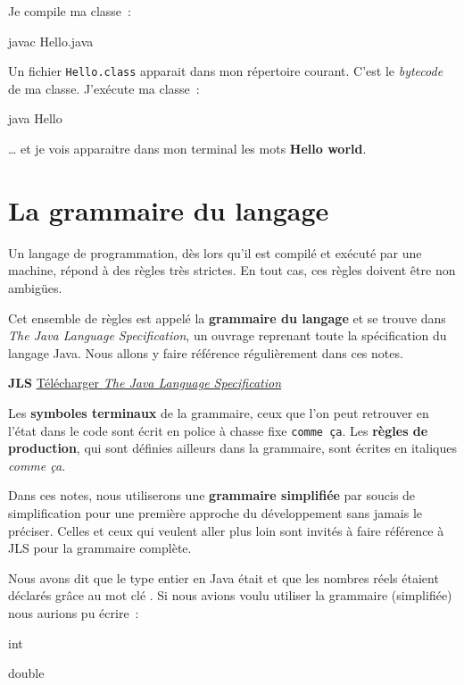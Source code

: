 Je compile ma classe~:

\begin{term}
	javac Hello.java
\end{term}

Un fichier \texttt{Hello.class} apparait dans mon répertoire courant. C'est le 
\textit{bytecode} de ma classe. J'exécute ma classe~:

\begin{term}
	java Hello
\end{term}

… et je vois apparaitre dans mon terminal les mots \textbf{Hello world}. 





\section{La grammaire du langage}

Un langage de programmation, dès lors qu'il est compilé et exécuté par une
machine, répond à des règles très strictes. En tout cas, ces règles doivent être
non ambigües. 

Cet ensemble de règles est appelé la \textbf{grammaire du
langage} et se trouve dans \textit{The Java Language
Specification}, un ouvrage reprenant toute la spécification du langage Java.
Nous allons y faire référence régulièrement dans ces notes. 

\textbf{JLS} 
\href{https://docs.oracle.com/javase/specs/}
{Télécharger \textit{The Java Language Specification}}

Les \textbf{symboles terminaux} de la grammaire, ceux que l'on peut retrouver en
l'état dans le code sont écrit en police à chasse fixe \texttt{comme ça}. Les
\textbf{règles de production}, qui sont définies ailleurs dans la grammaire, sont
écrites en italiques \textit{comme ça}. 

Dans ces notes, nous utiliserons une \textbf{grammaire simplifiée} par soucis de
simplification pour une première approche du développement sans jamais le
préciser. Celles et ceux qui veulent aller plus loin sont invités  à faire
référence à JLS pour la grammaire complète.

Nous avons dit que le type entier en Java était  et que les nombres
réels étaient déclarés grâce au mot clé . Si nous avions voulu
utiliser la grammaire (simplifiée) nous aurions pu écrire~:

\begin{grammaire}
	
	    int
	
	    double
\end{grammaire}

